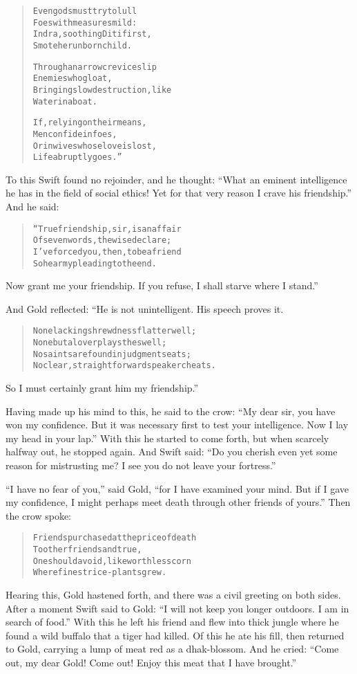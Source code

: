 \documentclass[article, twoside, 10pt]{memoir}
\renewenvironment{verbatim}{%
\begin{quote}%
\vskip -10pt%
\begin{alltt}\normalfont\small}{\end{alltt}%
\end{quote}%
\vskip -10pt
} %
\begin{document}
\begin{verbatim}
Even gods must try to lull
    Foes with measures mild:
Indra, soothing Diti first,
    Smote her unborn child.

Through a narrow crevice slip
    Enemies who gloat,
Bringing slow destruction, like
    Water in a boat.

If, relying on their means,
    Men confide in foes,
Or in wives whose love is lost,
    Life abruptly goes.”
\end{verbatim}
To this Swift found no rejoinder, and he thought:
``What an eminent intelligence he has in the field of social ethics! Yet for that very reason I crave his friendship.''
And he said:

\begin{verbatim}
“True friendship, sir, is an affair
Of seven words, the wise declare;
I've forced you, then, to be a friend{\textemdash}
So hear my pleading to the end.
\end{verbatim}
Now grant me your friendship. If you refuse, I shall starve where I
stand.”

And Gold reflected: “He is not unintelligent. His speech proves
it.

\begin{verbatim}
None lacking shrewdness flatter well;
None but a lover plays the swell;
No saints are found in judgment seats;
No clear, straightforward speaker cheats.
\end{verbatim}
So I must certainly grant him my friendship.”

Having made up his mind to this, he said to the crow:
``My dear sir, you have won my confidence. But it was necessary first to test your intelligence. Now I lay my head in your lap.''
With this he started to come forth, but when scarcely halfway out,
he stopped again. And Swift said:
``Do you cherish even yet some reason for mistrusting me? I see you do not leave your fortress.''

``I have no fear of you,'' said Gold,
``for I have examined your mind. But if I gave my confidence, I might perhaps meet death through other friends of yours.''
Then the crow spoke:

\begin{verbatim}
Friends purchased at the price of death
    To other friends and true,
One should avoid, like worthless corn
    Where finest rice-plants grew.
\end{verbatim}
Hearing this, Gold hastened forth, and there was a civil greeting
on both sides. After a moment Swift said to Gold:
``I will not keep you longer outdoors. I am in search of food.''
With this he left his friend and flew into thick jungle where he
found a wild buffalo that a tiger had killed. Of this he ate his
fill, then returned to Gold, carrying a lump of meat red as a
dhak-blossom. And he cried:
``Come out, my dear Gold! Come out! Enjoy this meat that I have brought.''
\end{document}
